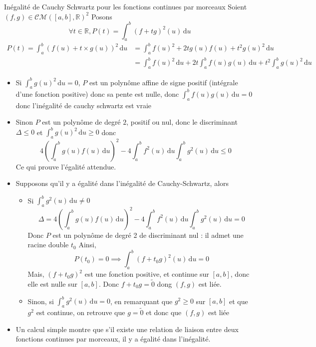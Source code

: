\documentclass{article}
\begin{document}
\begin{question_kholle}{Inégalité de Cauchy Schwartz pour les fonctions continues par morceaux}	
	Soient $(f, g) \in \mathcal{CM}([a, b], \mathbb{R})^{2}$
	Posons
$$
	\forall t \in \mathbb{R}, P(t) = \int_{a}^{b} (f+tg)^{2}(u) \, \mathrm du
$$
	\begin{align*}
		P(t) = \int_{a}^{b} (f(u)+t\times g(u))^{2} \, \mathrm du &= 
		\int_{a}^{b} f(u)^{2} + 2tg(u)f(u)+ t^{2} g(u)^{2} \, \mathrm du  \\
		&= \int_{a}^{b} f(u)^{2} \, \mathrm du + 2t\int_{a}^{b} f(u)g(u) \, \mathrm du + t^{2} \int_{a}^{b} g(u)^{2} \, \mathrm du
	\end{align*}
	\begin{itemize}[label=$\lozenge$]
		\item Si $\int_{a}^{b} g(u)^{2} \, \mathrm du = 0$, $P$ est un polynôme affine de signe positif (intégrale d'une fonction positive) donc sa pente est nulle, donc $\int_{a}^{b} f(u)g(u) \, \mathrm du =0$ donc l'inégalité de cauchy schwartz est vraie
		
		\item Sinon $P$ est un polynôme de degré $2$, positif ou nul, donc le discriminant $\Delta \leqslant 0$ et $\int_{a}^{b} g(u)^{2} \, \mathrm du \geqslant 0$
		donc 
$$
		4\left( \int_{a}^{b} g(u)f(u) \, \mathrm du  \right)^{2} - 4 \int_{a}^{b} f^{2}(u) \, \mathrm du \int_{a}^{b} g^{2}(u) \, \mathrm du \leqslant 0
$$
		Ce qui prouve l'égalité attendue.
	\end{itemize}
	\begin{itemize}[label=$\lozenge$]
		\item Supposons qu'il y a égalité dans l'inégalité de Cauchy-Schwartz, alors
		\begin{itemize}
			\item Si $\int_{a}^{b} g^{2}(u) \, \mathrm du \neq 0$
$$
			\Delta = 4\left( \int_{a}^{b} g(u)f(u) \, \mathrm du  \right)^{2} - 4 \int_{a}^{b} f^{2}(u) \, \mathrm du \int_{a}^{b} g^{2}(u) \, \mathrm du =0
$$
			Donc $P$ est un polynôme de degré 2 de discriminant nul : il admet une racine double $t_{0}$
			Ainsi, 
$$
			P(t_{0}) = 0 \implies \int_{a}^{b} (f+t_{0}g)^{2}(u) \, \mathrm du = 0
$$
			Mais, $(f+t_{0}g)^{2}$ est une fonction positive, et continue sur $[a, b]$, donc elle est nulle sur $[a, b]$.
			Donc $f+t_{0}g = \tilde{0}$ dong $(f, g)$ est liée.
			
			\item Sinon, si $\int_{a}^{b} g^{2}(u) \, \mathrm du = 0$, en remarquant que $g^{2}\geqslant 0$ sur $[a, b]$ et que $g^{2}$ est continue, on retrouve que $g = \tilde{0}$ et donc que $(f, g)$ est liée
		\end{itemize}
		\item Un calcul simple montre que s'il existe une relation de liaison entre deux fonctions continues par morceaux, il y a égalité dans l'inégalité.
	\end{itemize}
\end{question_kholle}
\end{document}

